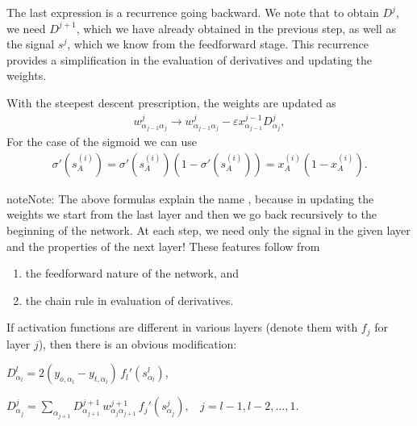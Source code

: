 \documentclass[letterpaper,10pt,english]{jupyterBook}
\begin{document}
\sphinxAtStartPar
The last expression is a recurrence going backward. We note that to obtain \(D^j\), we need \(D^{j+1}\), which we have already obtained in the previous step, as well as the signal \(s^j\), which we know from the feed\sphinxhyphen{}forward stage. This recurrence provides a simplification in the evaluation of derivatives and updating the weights.

\sphinxAtStartPar
With the steepest descent prescription, the weights are updated as
\begin{equation*}
\begin{split} w^j_{\alpha_{j-1} \alpha_j} \to  w^j_{\alpha_{j-1} \alpha_j} -\varepsilon x_{\alpha_{j-1}}^{j-1} D_{\alpha_j}^{j}, \end{split}
\end{equation*}
\sphinxAtStartPar
For the case of the sigmoid we can use
\begin{equation*}
\begin{split}
\sigma'(s_A^{(i)})=\sigma'(s_A^{(i)}) (1-\sigma'(s_A^{(i)})) =x_A^{(i)}(1-x_A^{(i)}).
\end{split}
\end{equation*}
\begin{sphinxadmonition}{note}{Note:}
\sphinxAtStartPar
The above formulas explain the name , because in updating the weights we start from the last layer and then we go back recursively to the beginning of the network. At each step, we need only the signal in the given layer and the properties of the next layer! These features follow from
\begin{enumerate}
%
\item {} 
\sphinxAtStartPar
the feed\sphinxhyphen{}forward nature of the network, and

\item {} 
\sphinxAtStartPar
the chain rule in evaluation of derivatives.

\end{enumerate}
\end{sphinxadmonition}

\sphinxAtStartPar
If activation functions are different in various layers (denote them with \(f_j\) for layer \(j\)), then there is an obvious modification:

\sphinxAtStartPar
\(D_{\alpha_l}^{l}=2 (y_{o,\alpha_l}-y_{t,\alpha_l})\, f_l'(s_{\alpha_l}^{l})\),

\sphinxAtStartPar
\(D_{\alpha_j}^{j}= \sum_{\alpha_{j+1}} D_{\alpha_{j+1}}^{j+1}\, w_{\alpha_j \alpha_{j+1}}^{j+1} \, f_j'(s_{\alpha_j}^{j}), ~~~~ j=l-1,l-2,\dots,1\).
\end{document}

